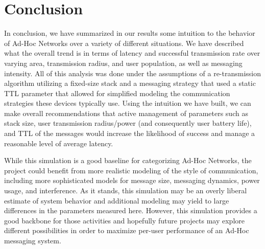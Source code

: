\section{Conclusion}
In conclusion, we have summarized in our results some intuition to the behavior of Ad-Hoc Networks
over a variety of different situations.
We have described what the overall trend is in terms of latency and successful transmission rate
over varying area, transmission radius, and user population, as well as messaging intensity.
All of this analysis was done under the assumptions of a re-transmission algorithm
utilizing a fixed-size stack and a messaging strategy that used a static TTL parameter
that allowed for simplified modeling the communication strategies these devices typically use.
Using the intuition we have built, we can make overall recommendations that
active management of parameters such as stack size, user transmission radius/power
(and consequently user battery life), and TTL of the messages would increase the likelihood of 
success and manage a reasonable level of average latency.

While this simulation is a good baseline for categorizing Ad-Hoc Networks, the project could
benefit from more realistic modeling of the style of communication, including more sophisticated
models for message size, messaging dynamics, power usage, and interference.
As it stands, this simulation may be an overly liberal estimate of system behavior and additional
modeling may yield to large differences in the parameters measured here.
However, this simulation provides a good backbone for those activities and hopefully future
projects may explore different possibilities in order to maximize per-user performance of
an Ad-Hoc messaging system.
